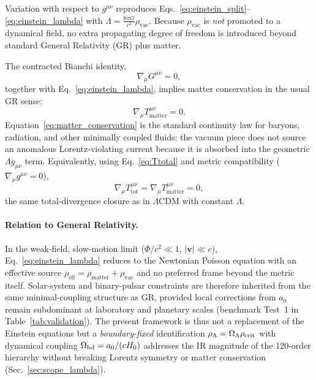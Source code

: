 \documentclass[prd,
               reprint,
               aps,
               preprintnumbers,
               nofootinbib,
               longbibliography,
               floatfix]{revtex4-2}
\begin{document}
Variation with respect to $g^{\mu\nu}$ reproduces
Eqs.~\eqref{eq:einstein_split}--\eqref{eq:einstein_lambda} with
$\Lambda=\frac{8\pi G}{c^2}\rho_{\text{vac}}$.
Because $\rho_{\text{vac}}$ is \emph{not} promoted to a dynamical field,
no extra propagating degree of freedom is introduced beyond standard
General Relativity (GR) plus matter.

The contracted Bianchi identity,
\begin{equation}
\label{eq:bianchi}
\nabla_\mu G^{\mu\nu}=0,
\end{equation}
together with Eq.~\eqref{eq:einstein_lambda}, implies matter conservation in the usual GR sense:
\begin{equation}
\label{eq:matter_conservation}
\boxed{
\nabla_\mu T^{\mu\nu}_{\text{matter}}=0.
}
\end{equation}
Equation~\eqref{eq:matter_conservation} is the standard continuity law
for baryons, radiation, and other minimally coupled fluids; the vacuum
piece does not source an anomalous Lorentz-violating current because it
is absorbed into the geometric $\Lambda g_{\mu\nu}$ term.
Equivalently, using Eq.~\eqref{eq:Ttotal} and metric compatibility
($\nabla_\mu g^{\mu\nu}=0$),
\begin{equation}
\label{eq:Ttot_conservation}
\nabla_\mu T^{\mu\nu}_{\text{tot}}
=
\nabla_\mu T^{\mu\nu}_{\text{matter}}=0,
\end{equation}
the same total-divergence closure as in $\Lambda$CDM with constant
$\Lambda$.

\paragraph{Relation to General Relativity.}
In the weak-field, slow-motion limit ($\Phi/c^2\ll 1$,
$|\mathbf{v}|\ll c$), Eq.~\eqref{eq:einstein_lambda} reduces to the Newtonian Poisson equation
with an effective source
$\rho_{\text{eff}}=\rho_{\text{matter}}+\rho_{\text{vac}}$ and no
preferred frame beyond the metric itself. Solar-system and binary-pulsar
constraints are therefore inherited from the same minimal-coupling
structure as GR, provided local corrections from $a_0$ remain
subdominant at laboratory and planetary scales (benchmark Test~1 in
Table~\ref{tab:validation}). The present framework is thus not a
replacement of the Einstein equations but a \emph{boundary-fixed}
identification $\rho_{\Lambda}=\Omega_\Lambda\rho_{\rm crit}$ with dynamical
coupling $\Omega_{\rm bd}=a_0/(cH_0)$ addresses the IR magnitude of the
120-order hierarchy without breaking Lorentz symmetry or matter
conservation (Sec.~\ref{sec:scope_lambda}).
\end{document}

